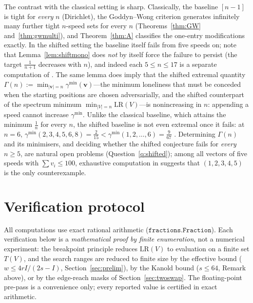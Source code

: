 \documentclass[11pt]{article}
\theoremstyle{definition}
\newcommand{\LR}{\mathrm{LR}}
\begin{document}
The contrast with the classical setting is sharp.  Classically, the
baseline $[n-1]$ is tight for \emph{every} $n$ (Dirichlet), the
Goddyn--Wong criterion generates infinitely many further tight $n$-speed
sets for every $n$ (Theorems~\ref{thm:GW} and~\ref{thm:gwmulti}), and
Theorem~\ref{thm:A} classifies the one-entry modifications exactly.  In
the shifted setting the baseline itself fails from five speeds on; note
that Lemma~\ref{lem:shiftmono} does \emph{not} by itself force the
failure to persist (the target $\frac1{n+1}$ decreases with $n$), and
indeed each $5\le n\le17$ is a separate computation of
\cite{BlancoCriadoSantos2026}.  The same lemma does imply that the
shifted extremal quantity
$\Gamma(n):=\min_{\lvert\mathbf v\rvert=n}\gamma^{\min}(\mathbf v)$---the
minimum loneliness that must be conceded when the starting positions are
chosen adversarially, and the shifted counterpart of the spectrum
minimum $\min_{\lvert V\rvert=n}\LR(V)$---is
nonincreasing in $n$: appending a speed cannot increase
$\gamma^{\min}$.  Unlike the classical baseline, which attains the
minimum $\frac1n$ for every $n$, the shifted baseline is not even
extremal once it fails: at $n=6$,
$\gamma^{\min}(2,3,4,5,6,8)=\frac2{15}<
\gamma^{\min}(1,2,\dots,6)=\frac9{67}$ \cite{BlancoCriadoSantos2026}.
Determining $\Gamma(n)$ and its minimisers, and deciding whether the
shifted conjecture fails for \emph{every} $n\ge5$, are natural open
problems (Question~\ref{q:shifted}); among all vectors of five speeds
with $\sum v_i\le100$, exhaustive computation in
\cite{BlancoCriadoSantos2026} suggests that $(1,2,3,4,5)$ is the only
counterexample.

\section{Verification protocol}\label{sec:comp}

All computations use exact rational arithmetic ($\mathtt{fractions.Fraction}$).
Each verification below is a \emph{mathematical proof by finite enumeration},
not a numerical experiment: the breakpoint principle reduces $\LR(V)$ to
evaluation on a finite set $T(V)$, and the search ranges are reduced to
finite size by the effective bound ($w\le4rI/(2s-I)$, Section~\ref{sec:prelim}),
by the Kanold bound ($s\le64$, Remark above), or by the edge-reach masks
of Section~\ref{sec:twoswap}.  The floating-point
pre-pass is a convenience only; every reported value is certified in
exact arithmetic.
\end{document}
